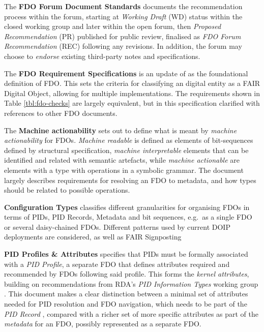 \documentclass[fleqn,10pt,NOlineno]{wlpeerjlua}
\begin{document}
The \textbf{FDO Forum Document Standards} \autocite{fdo-DocProcessStd} documents the recommendation process within the forum, starting at \emph{Working Draft} (WD) status within the closed working group and later within the open forum, then \emph{Proposed Recommendation} (PR) published for public review, finalised as \emph{FDO Forum Recommendation} (REC) following any revisions. In addition, the forum may choose to \emph{endorse} existing third-party notes and specifications.

The \textbf{FDO Requirement Specifications} \autocite{fdo-RequirementSpec} is an update of \autocite{boninoFAIRDigitalObject} as the foundational definition of FDO. This sets the criteria for classifying an digital entity as a FAIR Digital Object, allowing for multiple implementations. The requirements shown in Table \vref{tbl:fdo-checks} are largely equivalent, but in this specification clarified with references to other FDO documents.

The \textbf{Machine actionability} \autocite{fdo-MachineActionDef} sets out to define what is meant by \emph{machine actionability} for FDOs. \emph{Machine readable} is defined as elements of bit-sequences defined by structural specification, \emph{machine interpretable} elements that can be identified and related with semantic artefacts, while \emph{machine actionable} are elements with a type with operations in a symbolic grammar. The document largely describes requirements for resolving an FDO to metadata, and how types should be related to possible operations.

\textbf{Configuration Types} \autocite{fdo-ConfigurationTypes} classifies different granularities for organising FDOs in terms of PIDs, PID Records, Metadata and bit sequences, e.g.~as a single FDO or several daisy-chained FDOs. Different patterns used by current DOIP deployments are considered, as well as FAIR Signposting \autocite{vandesompelFAIRSignpostingProfile2022}

\textbf{PID Profiles \& Attributes} \autocite{fdo-PIDProfileAttributes} specifies that PIDs must be formally associated with a \emph{PID Profile}, a separate FDO that defines attributes required and recommended by FDOs following said profile. This forms the \emph{kernel attributes}, building on recommendations from RDA's \emph{PID Information Types} working group \autocite{weigelRDARecommendationPID2018}. This document makes a clear distinction between a minimal set of attributes needed for PID resolution and FDO navigation, which needs to be part of the \emph{PID Record} \autocite{islam_2023}, compared with a richer set of more specific attributes as part of the \emph{metadata} for an FDO, possibly represented as a separate FDO.
\end{document}
